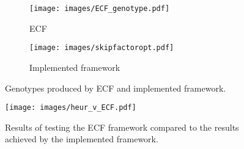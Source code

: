 \begin{figure}[H]
\centering
\begin{subfigure}{.4\textwidth}
\begin{flushleft}
  \centering
  \texttt{[image: images/ECF\_genotype.pdf]}
  \caption{ECF}
  \label{ecf_genotypes}
\end{flushleft}
\end{subfigure}
\begin{subfigure}{.5\textwidth}
\begin{flushright}
  \centering
  \texttt{[image: images/skipfactoropt.pdf]}
  \caption{Implemented framework}
  \label{impl_genotype}
\end{flushright}
\end{subfigure}
\caption{Genotypes produced by ECF and implemented framework.}
\label{final_genotypes}
\end{figure}
\begin{figure}[H]
    \centering
    \texttt{[image: images/heur\_v\_ECF.pdf]}
    \caption{Results of testing the ECF framework compared to the results achieved by the implemented framework.}
    \label{ecf_v_heur}
\end{figure}

